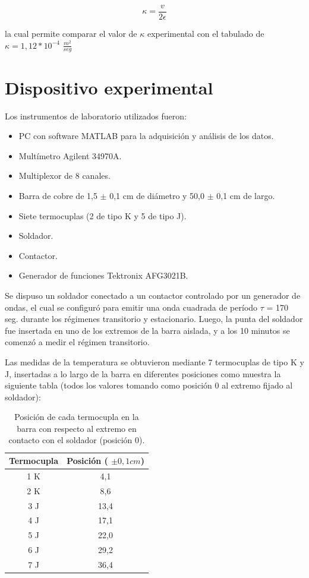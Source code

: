 \documentclass[twoside,twocolumn,a4paper]{article}
\begin{document}
\begin{equation}
\label{eq:kappa}
\kappa = \frac{v}{2\epsilon}
\end{equation}

la cual permite comparar el valor de $\kappa$ experimental con el tabulado \cite{teo:kappa} de $\kappa = 1,12*10^{-4}$ $\frac{m^{2}}{seg}$


\section{Dispositivo experimental}

Los instrumentos de laboratorio utilizados fueron:
\begin{itemize}
\item 
\label{Laser} PC con software MATLAB para la adquisici\'on y an\'alisis de los datos.
\item Mult\'imetro Agilent 34970A.
\item Multiplexor de 8 canales.
\item Barra de cobre de 1,5 $\pm$ 0,1 cm de di\'ametro y 50,0 $\pm$ 0,1 cm de largo.
\item Siete termocuplas (2 de tipo K y 5 de tipo J).
\item Soldador.
\item Contactor.
\item Generador de funciones Tektronix AFG3021B.
\end{itemize}

Se dispuso un soldador conectado a un contactor controlado por un generador de ondas, el cual se configur\'o para emitir una onda cuadrada de per\'iodo $\tau$ = 170 seg. durante los r\'egimenes transitorio y estacionario. Luego, la punta del soldador fue insertada en uno de los extremos de la barra aislada, y a los 10 minutos se comenz\'o a medir el r\'egimen transitorio. \newline

\par
Las medidas de la temperatura se obtuvieron mediante 7 termocuplas de tipo K y J, insertadas a lo largo de la barra en diferentes posiciones como muestra la siguiente tabla (todos los valores tomando como posici\'on 0 al extremo fijado al soldador):

\begin{table}[H]
\centering
\caption{Posici\'on de cada termocupla en la barra con respecto al extremo en contacto con el soldador (posici\'on 0).}
\label{tab:posiciones}
\begin{tabular}{|c|c|}
\hline
Termocupla & Posici\'on ( $\pm 0,1 cm$) \\ \hline
1 K & 4,1\\ \hline
2 K & 8,6\\ \hline
3 J & 13,4\\ \hline
4 J & 17,1\\ \hline
5 J & 22,0\\ \hline
6 J & 29,2\\ \hline
7 J & 36,4\\ \hline
\end{tabular}
\end{table}
\end{document}

